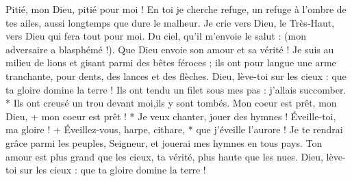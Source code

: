 Pitié, mon Dieu, pitié pour moi ! En toi je cherche refuge, un refuge à l'ombre de tes ailes, aussi longtemps que dure le malheur.
\versseparator
Je crie vers Dieu, le Très-Haut, vers Dieu qui fera tout pour moi.
\versseparator
Du ciel, qu'il m'envoie le salut : (mon adversaire a blasphémé !). Que Dieu envoie son amour et sa vérité !
\versseparator
Je suis au milieu de lions et gisant parmi des bêtes féroces ; ils ont pour langue une arme tranchante, pour dents, des lances et des flèches.
\versseparator
Dieu, lève-toi sur les cieux : que ta gloire domine la terre !
\versseparator
Ils ont tendu un filet sous mes pas : j'allais succomber. * Ils ont creusé un trou devant moi,ils y sont tombés.
\versseparator
Mon coeur est prêt, mon Dieu, + mon coeur est prêt ! * Je veux chanter, jouer des hymnes !
\versseparator
Éveille-toi, ma gloire ! + Éveillez-vous, harpe, cithare, * que j'éveille l'aurore !
\versseparator
Je te rendrai grâce parmi les peuples, Seigneur, et jouerai mes hymnes en tous pays.
\versseparator
Ton amour est plus grand que les cieux, ta vérité, plus haute que les nues.
\versseparator
Dieu, lève-toi sur les cieux : que ta gloire domine la terre !
